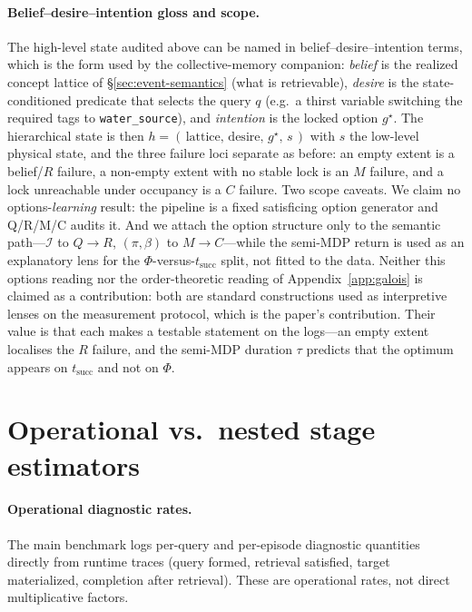 \documentclass{article}
\newcommand{\method}[1]{\texttt{#1}}
\begin{document}
\paragraph{Belief--desire--intention gloss and scope.}
The high-level state audited above can be named in
belief--desire--intention terms, which is the form used by the
collective-memory companion: \emph{belief} is the realized concept
lattice of \S\ref{sec:event-semantics} (what is retrievable), \emph{desire}
is the state-conditioned predicate that selects the query $q$ (e.g.\ a
thirst variable switching the required tags to \method{water\_source}),
and \emph{intention} is the locked option $g^\star$. The hierarchical
state is then $h=(\,\text{lattice},\,\text{desire},\,g^\star,\,s\,)$ with
$s$ the low-level physical state, and the three failure loci separate as
before: an empty extent is a belief/$R$ failure, a non-empty extent
with no stable lock is an $M$ failure, and a lock unreachable under
occupancy is a $C$ failure. Two scope caveats. We claim no
options-\emph{learning} result: the pipeline is a fixed satisficing option
generator \citep{simon1955behavioral} and Q/R/M/C audits it. And we attach
the option structure only to the semantic path---$\mathcal{I}$ to
$Q\!\rightarrow\!R$, $(\pi,\beta)$ to $M\!\rightarrow\!C$---while the
semi-MDP return is used as an explanatory lens for the
$\Phi$-versus-$t_{\mathrm{succ}}$ split, not fitted to the data. Neither
this options reading nor the order-theoretic reading of
Appendix~\ref{app:galois} is claimed as a contribution: both are standard
constructions used as interpretive lenses on the measurement protocol,
which is the paper's contribution. Their value is that each makes a
testable statement on the logs---an empty extent localises the $R$
failure, and the semi-MDP duration $\tau$ predicts that the optimum
appears on $t_{\mathrm{succ}}$ and not on $\Phi$.

\section{Operational vs.\ nested stage estimators}
\label{app:estimators}

\paragraph{Operational diagnostic rates.}
The main benchmark logs per-query and per-episode diagnostic quantities directly from runtime traces (query formed, retrieval satisfied, target materialized, completion after retrieval). These are operational rates, not direct multiplicative factors.
\end{document}
